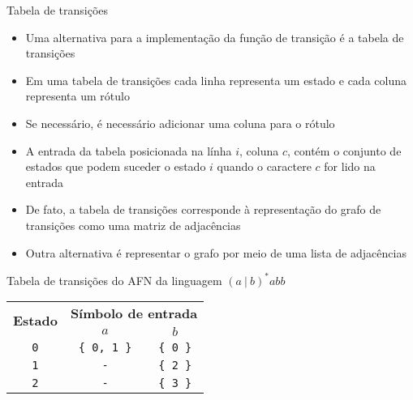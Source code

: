 \begin{frame}[fragile]{Tabela de transições}

    \begin{itemize}
        \item Uma alternativa para a implementação da função de transição é a tabela de transições

        \item Em uma tabela de transições cada linha representa um estado e cada coluna representa um rótulo

        \item Se necessário, é necessário adicionar uma coluna para o rótulo 

        \item A entrada da tabela posicionada na línha $i$, coluna $c$, contém o conjunto de estados que podem suceder o estado $i$ quando o caractere $c$
            for lido na entrada

        \item De fato, a tabela de transições corresponde à representação do grafo de transições como uma matriz de adjacências

        \item Outra alternativa é representar o grafo por meio de uma lista de adjacências
    \end{itemize}

\end{frame}

\begin{frame}[fragile]{Tabela de transições do AFN da linguagem $(a\ |\ b)^*abb$}

    \begin{table}
        \centering

        \begin{tabular}{ccc}
        \toprule
        \multirow{2}{*}{\textbf{Estado}} & \multicolumn{2}{c}{\textbf{Símbolo de entrada}} \\
        & $a$ & $b$ \\ 
        \midrule
        \texttt{0} & \texttt{\{ 0, 1 \}} & \texttt{\{ 0 \}} \\
        \texttt{1} & \texttt{-} & \texttt{\{ 2 \}} \\
        \texttt{2} & \texttt{-} & \texttt{\{ 3 \}} \\
        \bottomrule
        \end{tabular}
    \end{table}

\end{frame}

